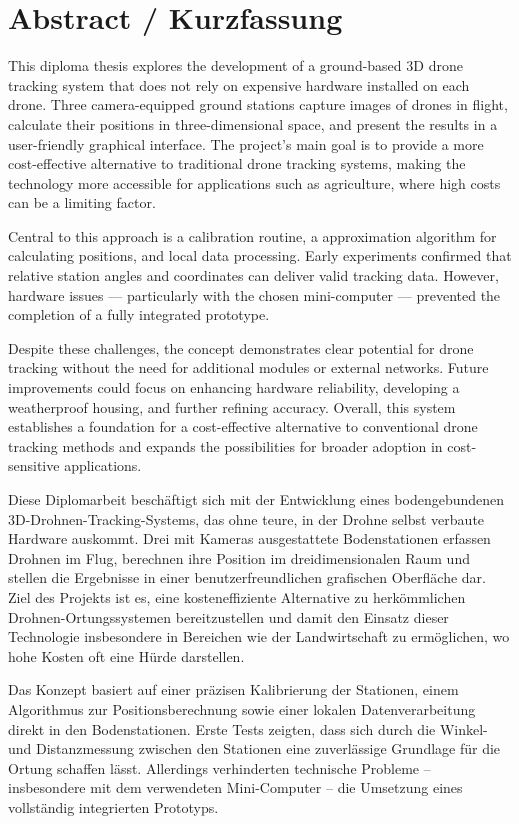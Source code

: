 \chapter*{Abstract / Kurzfassung}
\label{cha:abstract}

This diploma thesis explores the development of a ground-based 3D drone tracking system that does not rely on expensive hardware installed on each drone. Three camera-equipped ground stations capture images of drones in flight, calculate their positions in three-dimensional space, and present the results in a user-friendly graphical interface. The project’s main goal is to provide a more cost-effective alternative to traditional drone tracking systems, making the technology more accessible for applications such as agriculture, where high costs can be a limiting factor.

Central to this approach is a calibration routine, a approximation algorithm for calculating positions, and local data processing. Early experiments confirmed that relative station angles and coordinates can deliver valid tracking data. However, hardware issues — particularly with the chosen mini-computer — prevented the completion of a fully integrated prototype.

Despite these challenges, the concept demonstrates clear potential for drone tracking without the need for additional modules or external networks. Future improvements could focus on enhancing hardware reliability, developing a weatherproof housing, and further refining accuracy. Overall, this system establishes a foundation for a cost-effective alternative to conventional drone tracking methods and expands the possibilities for broader adoption in cost-sensitive applications.

\vspace{1cm}

Diese Diplomarbeit beschäftigt sich mit der Entwicklung eines bodengebundenen 3D-Drohnen-Tracking-Systems, das ohne teure, in der Drohne selbst verbaute Hardware auskommt. Drei mit Kameras ausgestattete Bodenstationen erfassen Drohnen im Flug, berechnen ihre Position im dreidimensionalen Raum und stellen die Ergebnisse in einer benutzerfreundlichen grafischen Oberfläche dar. Ziel des Projekts ist es, eine kosteneffiziente Alternative zu herkömmlichen Drohnen-Ortungssystemen bereitzustellen und damit den Einsatz dieser Technologie insbesondere in Bereichen wie der Landwirtschaft zu ermöglichen, wo hohe Kosten oft eine Hürde darstellen.

Das Konzept basiert auf einer präzisen Kalibrierung der Stationen, einem Algorithmus zur Positionsberechnung sowie einer lokalen Datenverarbeitung direkt in den Bodenstationen. Erste Tests zeigten, dass sich durch die Winkel- und Distanzmessung zwischen den Stationen eine zuverlässige Grundlage für die Ortung schaffen lässt. Allerdings verhinderten technische Probleme – insbesondere mit dem verwendeten Mini-Computer – die Umsetzung eines vollständig integrierten Prototyps.

